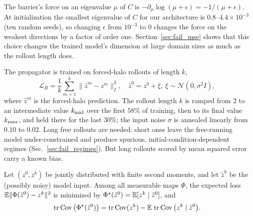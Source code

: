 \begin{remark}
\label{rem:epsilon}
The barrier's force on an eigenvalue $\mu$ of $C$ is
$-\partial_\mu\log(\mu+\epsilon) = -1/(\mu+\epsilon)$. At initialization
the smallest eigenvalue of $C$ for our architecture is
$0.8$--$4.4\times10^{-3}$ (ten random seeds), so changing $\epsilon$
from $10^{-3}$ to $0$ changes the force on the weakest directions by a
factor of order one. Section~\ref{sec:fail_mse} shows that this choice
changes the trained model's dimension at large domain sizes as much as
the rollout length does.
\end{remark}

The propagator is trained on forced-halo rollouts of length $k$,
\begin{equation}
  \mathcal{L}_B = \frac1k\sum_{m=1}^{k}
  \big\|\hat z^{m} - z^{m}\big\|_{I}^{2},
  \quad \hat z^{0} = z^{0} + \xi,\ \xi\sim\mathcal N(0,\sigma^2 I),
  \label{eq:stageB}
\end{equation}
where $\hat z^{m}$ is the forced-halo prediction. The rollout length $k$
is ramped from $2$ to an intermediate value $k_{\mathrm{mid}}$ over the first $58\%$
of training, then to its final value $k_{\max}$, and held there for the last
$30\%$; the input noise $\sigma$ is
annealed linearly from $0.10$ to $0.02$. Long free rollouts are needed:
short ones leave the free-running model under-constrained and produce
spurious, initial-condition-dependent regimes (Sec.~\ref{sec:fail_regimes}).
But long rollouts scored by mean squared error carry a known bias.

\begin{lemma}
\label{lem:mse}
Let $(z^0, z^k)$ be jointly distributed with finite second moments, and
let $\tilde z^0$ be the (possibly noisy) model input. Among all
measurable maps $\Phi$, the expected loss
$\mathbb{E}\|\Phi(\tilde z^0)-z^k\|^2$ is minimized by
$\Phi^\star(\tilde z^0)=\mathbb{E}[z^k\mid\tilde z^0]$, and
\begin{equation}
  \operatorname{tr}\operatorname{Cov}\big(\Phi^\star(\tilde z^0)\big)
  = \operatorname{tr}\operatorname{Cov}(z^k) - \mathbb{E}\,\operatorname{tr}\operatorname{Cov}\big(z^k\mid\tilde z^0\big).
  \label{eq:total_variance}
\end{equation}
\end{lemma}

